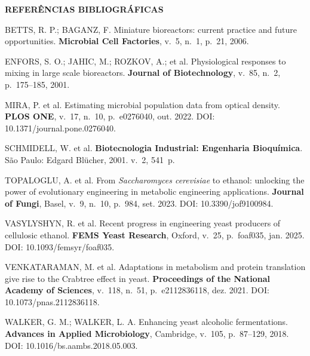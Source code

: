 \clearpage
%

\vspace{1\baselineskip}
{\centering\bfseries REFERÊNCIAS BIBLIOGRÁFICAS\par}
\begingroup
\vspace{-0.5\baselineskip}
\singlespacing
\setlength{\parskip}{\baselineskip}
\setlength{\parindent}{0pt}

BETTS, R. P.; BAGANZ, F. Miniature bioreactors: current practice and future opportunities. \textbf{Microbial Cell Factories}, v.~5, n.~1, p.~21, 2006.

ENFORS, S. O.; JAHIC, M.; ROZKOV, A.; et al. Physiological responses to mixing in large scale bioreactors. \textbf{Journal of Biotechnology}, v.~85, n.~2, p.~175--185, 2001.

MIRA, P. et al. Estimating microbial population data from optical density. \textbf{PLOS ONE}, v.~17, n.~10, p.~e0276040, out. 2022. DOI: 10.1371/journal.pone.0276040.

SCHMIDELL, W. et al. \textbf{Biotecnologia Industrial: Engenharia Bioquímica}. São Paulo: Edgard Blücher, 2001. v.~2, 541~p.

TOPALOGLU, A. et al. From \textit{Saccharomyces cerevisiae} to ethanol: unlocking the power of evolutionary engineering in metabolic engineering applications. \textbf{Journal of Fungi}, Basel, v.~9, n.~10, p.~984, set. 2023. DOI: 10.3390/jof9100984.

VASYLYSHYN, R. et al. Recent progress in engineering yeast producers of cellulosic ethanol. \textbf{FEMS Yeast Research}, Oxford, v.~25, p.~foaf035, jan. 2025. DOI: 10.1093/femsyr/foaf035.

VENKATARAMAN, M. et al. Adaptations in metabolism and protein translation give rise to the Crabtree effect in yeast. \textbf{Proceedings of the National Academy of Sciences}, v.~118, n.~51, p.~e2112836118, dez. 2021. DOI: 10.1073/pnas.2112836118.

WALKER, G. M.; WALKER, L. A. Enhancing yeast alcoholic fermentations. \textbf{Advances in Applied Microbiology}, Cambridge, v.~105, p.~87--129, 2018. DOI: 10.1016/bs.aambs.2018.05.003.
\endgroup
